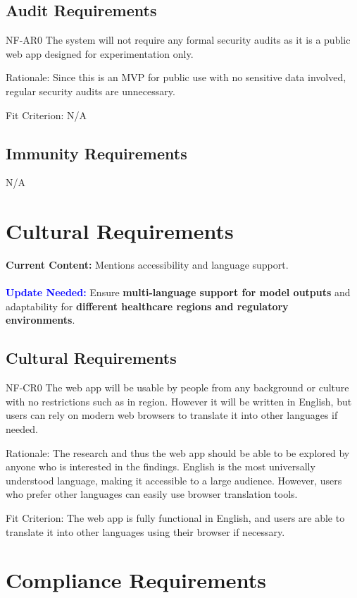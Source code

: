 \documentclass[12pt]{article}
\begin{document}
\subsection{Audit Requirements}
NF-AR0 The system will not require any formal security audits as it is a public web app designed 
for experimentation only.

Rationale: Since this is an MVP for public use with no sensitive data involved, regular security 
audits are unnecessary.

Fit Criterion: N/A

\subsection{Immunity Requirements}
N/A

\section{Cultural Requirements}

\textbf{Current Content:} Mentions accessibility and language support. \\
\\
\textbf{\textcolor{blue}{Update Needed:}} Ensure \textbf{multi-language support for model outputs} and adaptability for \textbf{different healthcare regions and regulatory environments}.

\subsection{Cultural Requirements}
NF-CR0 The web app will be usable by people from any background or culture with no restrictions 
such as in region. However it will be written in English, but users can rely on modern web 
browsers to translate it into other languages if needed.

Rationale: The research and thus the web app should be able to be explored by anyone who is 
interested in the findings. English is the most universally understood language, making it 
accessible to a large audience. However, users who prefer other languages can easily use browser 
translation tools.

Fit Criterion: The web app is fully functional in English, and users are able to translate it into 
other languages using their browser if necessary.


\section{Compliance Requirements}
\end{document}
